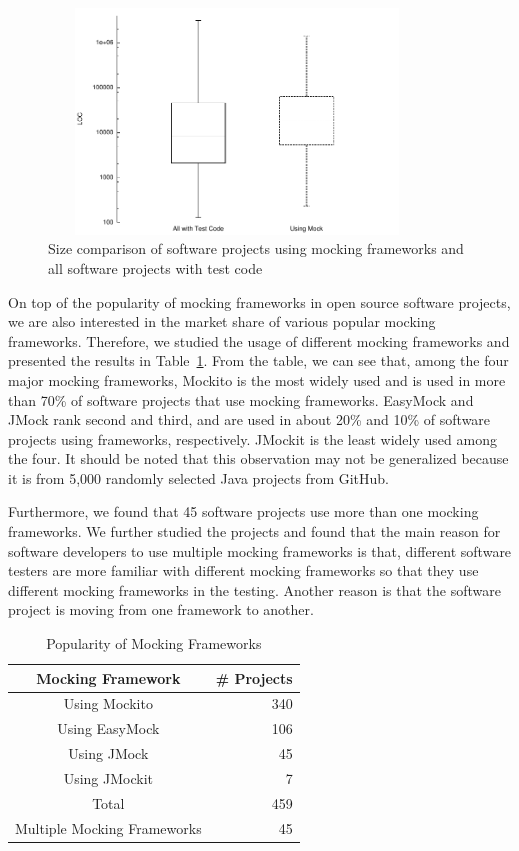 \begin{figure}


  \center
\includegraphics[width=100mm, height=60mm]{mocking/boxplot.pdf}

  \caption{\label{fig:box} Size comparison of software projects using mocking frameworks and all software projects with test code}


\end{figure}

                       
On top of the popularity of mocking frameworks in open source software projects, we are also interested in the market share of various popular mocking frameworks. Therefore, we studied the usage of different mocking frameworks and presented the results in Table~\ref{table:var}. From the table, we can see that, among the four major mocking frameworks, Mockito is the most widely used and is used in more than 70\% of software projects that use mocking frameworks. EasyMock and JMock rank second and third, and are used in about 20\% and 10\% of software projects using frameworks, respectively. JMockit is the least widely used among the four. It should be noted that this observation may not be generalized because it is from 5,000 randomly selected Java projects from GitHub. 

Furthermore, we found that 45 software projects use more than one mocking frameworks. We further studied the projects and found that the main reason for software developers to use multiple mocking frameworks is that, different software testers are more familiar with different mocking frameworks so that they use different mocking frameworks in the testing. Another reason is that the software project is moving from one framework to another. 

\begin{table}
\caption{Popularity of Mocking Frameworks}


\label{table:var}
\centering
\begin{tabular}{|c|r|}
\hline
 Mocking Framework & \# Projects\\
\hline
 Using Mockito & 340\\
 Using EasyMock & 106\\
 Using JMock & 45\\
 Using JMockit & 7\\
 Total & 459\\
 Multiple Mocking Frameworks & 45\\
\hline
\end{tabular}


\end{table}

